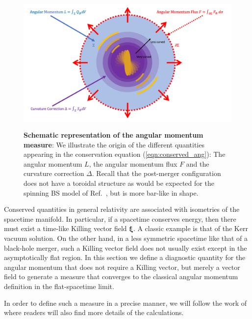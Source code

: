 \documentclass[aps,twocolumn,nofootinbib,superscriptaddress,amsfonts,floatfix
]{revtex4-1} %
\newcommand{\bs}{\boldsymbol}
\begin{document}
\begin{figure}[t]
\begin{center}
    {\includegraphics[width=1.5\columnwidth]{FigureRobinPaper.png}}
\caption{{\bf Schematic representation of the angular momentum measure}: We illustrate the origin of the different quantities 
appearing in the conservation equation
(\ref{eqn:conserved_ang}): The angular momentum
    ${L}$, the {angular momentum flux} $F$ and the
    curvature correction ${\Delta}$. Recall that the post-merger
    configuration does not have a toroidal structure
    as would be expected for the spinning BS model of
    Ref.~\cite{PhysRevD.90.024068,Yoshida:1997qf}, but is more bar-like in shape.
    }
\label{fig:AngMomTrick}
\end{center}
\end{figure}

Conserved quantities in general relativity are associated with isometries of the spacetime manifold. In particular, if a spacetime conserves energy, then there must exist a time-like Killing vector field $\bs{\xi}$. A classic example is that of the Kerr vacuum solution. On the other hand, in a less symmetric spacetime like that of a black-hole merger, such a Killing vector field does not usually exist except in the asymptotically flat region. In this section we define a diagnostic quantity for the angular momentum that does not require a Killing vector, but merely a vector field to generate a measure that
converges to the classical angular momentum definition
in the flat-spacetime limit.

In order to define such a measure in a
precise manner, we will follow the work of \cite{Croft:2022gks,Clough:2021qlv} where readers will also
find more details of the calculations.
\end{document}
